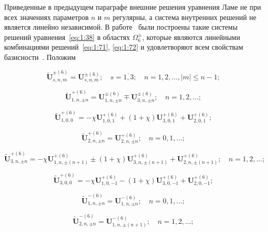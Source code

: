 Приведенные в предыдущем параграфе внешние решения уравнения Ламе не при всех значениях параметров $n$ и $m$ регулярны, а система внутренних решений не является линейно независимой. В работе~\cite{Nikolaev1993} были построены такие системы решений уравнения~\eqref{eq:1:38} в областях $\Omega_6^{\pm}$, которые являются линейными комбинациями решений~\eqref{eq:1:71}, \eqref{eq:1:72} и удовлетворяют всем свойствам базисности~\cite{Nikolaev1998}. Положим

\begin{equation}\label{eq:1:89o}
\mathbf{\tilde U}_{s,n,m}^{\pm(6)}=\mathbf{U}_{s,n,m}^{\pm(6)};\quad s=\overline{1,3};\quad n=1,2,\dots, |m|\le n-1;
\end{equation}

\begin{equation}\label{eq:1:90o}
\mathbf{\tilde U}_{1,n,\pm n}^{+(6)}=\mathbf{U}_{1,n,\pm n}^{\pm(6)}\mp\mathbf{U}_{3,n,\pm n}^{\pm(6)};\quad n=1,2,\dots;
\end{equation}

\begin{equation}\label{eq:1:91o}
\mathbf{\tilde U}_{1,0,0}^{+(6)}=-\chi\mathbf{U}_{1,0,1}^{+(6)}+(1+\chi)\mathbf{U}_{3,0,1}^{+(6)}+
\mathbf{U}_{2,0,1}^{+(6)};
\end{equation}

\begin{equation}\label{eq:1:92o}
\mathbf{\tilde U}_{2,n,\pm n}^{+(6)}=\mathbf{U}_{2,n,\pm n}^{+(6)};\quad n=0,1,\dots;
\end{equation}

\begin{equation}\label{eq:1:93o}
\mathbf{\tilde U}_{3,n,\pm n}^{+(6)}=-\chi\mathbf{U}_{1,n,\pm (n+1)}^{+(6)}\pm(1+\chi)\mathbf{U}_{3,n,\pm (n+1)}^{+(6)}+\mathbf{U}_{2,n,\pm (n+1)}^{+(6)};\quad n=1,2,\dots;
\end{equation}

\begin{equation}\label{eq:1:94o}
\mathbf{\tilde U}_{3,0,0}^{+(6)}=-\chi\mathbf{U}_{1,0,-1}^{+(6)}-(1+\chi)\mathbf{U}_{3,0,-1}^{+(6)}+
\mathbf{U}_{2,0,-1}^{+(6)};
\end{equation}

\begin{equation}\label{eq:1:95o}
\mathbf{\tilde U}_{1,n,\pm n}^{-(6)}=\mathbf{U}_{1,n,\pm n}^{-(6)};\quad n=0,1,\dots;
\end{equation}

\begin{equation}\label{eq:1:96o}
\mathbf{\tilde U}_{2,n,\pm n}^{-(6)}=\mathbf{U}_{1,n,\pm (n+1)}^{-(6)};\quad n=1,2,\dots;
\end{equation}

